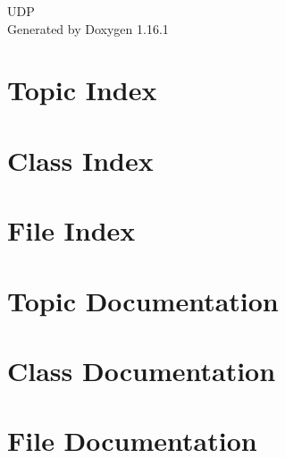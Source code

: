 \documentclass[twoside]{book}
\newcommand{\+}{\discretionary{\mbox{\scriptsize$\hookleftarrow$}}{}{}}
\newcommand{\clearemptydoublepage}{%
    \newpage{\pagestyle{empty}\cleardoublepage}%
  }
\begin{document}
  \raggedbottom
    \hypersetup{pageanchor=false,
                bookmarksnumbered=true,
                pdfencoding=unicode
               }
  \begin{titlepage}
  \vspace*{7cm}
  \begin{center}%
  {\Large UDP}\\
  \vspace*{1cm}
  {\large Generated by Doxygen 1.16.1}\\
  \end{center}
  \end{titlepage}
  \clearemptydoublepage
  \tableofcontents
  \clearemptydoublepage
  \hypersetup{pageanchor=true}

\chapter{Topic Index}

\chapter{Class Index}

\chapter{File Index}

\chapter{Topic Documentation}

\chapter{Class Documentation}



\chapter{File Documentation}




  \backmatter
  \newpage
  \clearemptydoublepage
  \printindex
\end{document}
